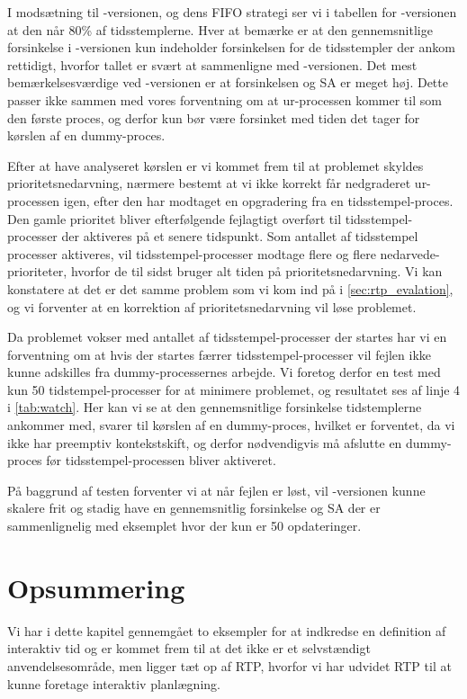 I modsætning til -versionen, og dens FIFO strategi ser vi i tabellen for -versionen at den  når 80\% af tidsstemplerne. Hver at bemærke er at den gennemsnitlige forsinkelse i -versionen kun indeholder forsinkelsen for de tidsstempler der ankom rettidigt, hvorfor tallet er svært at sammenligne med -versionen. Det mest bemærkelsesværdige ved -versionen er at forsinkelsen og SA  er meget høj. Dette passer ikke sammen med vores forventning om at ur-processen kommer til som den første proces, og derfor kun bør være forsinket med tiden det tager for kørslen af en  dummy-proces.

Efter at have analyseret kørslen er vi kommet frem til at problemet skyldes prioritetsnedarvning, nærmere bestemt at vi ikke korrekt får nedgraderet ur-processen igen, efter den har modtaget en opgradering fra en tidsstempel-proces. Den gamle prioritet bliver efterfølgende fejlagtigt overført til tidsstempel-processer der aktiveres på et senere tidspunkt. Som antallet af tidsstempel processer aktiveres, vil tidsstempel-processer modtage flere og flere nedarvede-prioriteter, hvorfor de til sidst bruger alt tiden på prioritetsnedarvning.  Vi kan konstatere at det er det samme problem som vi kom ind på i \cref{sec:rtp_evalation}, og vi forventer at en korrektion af prioritetsnedarvning vil løse problemet. 

Da problemet vokser med antallet af tidsstempel-processer der startes har vi en forventning om at hvis der startes færrer tidsstempel-processer vil fejlen ikke kunne adskilles fra dummy-processernes arbejde. Vi foretog derfor en test med kun 50 tidstempel-processer for at minimere problemet, og resultatet ses af linje 4 i \cref{tab:watch}. Her kan vi se at  den gennemsnitlige forsinkelse tidstemplerne ankommer med, svarer til kørslen af en dummy-proces, hvilket er forventet, da vi ikke har preemptiv kontekstskift, og derfor nødvendigvis må afslutte en dummy-proces før tidsstempel-processen bliver aktiveret. 

På baggrund af testen forventer vi at når fejlen er løst, vil -versionen kunne skalere frit og stadig have en gennemsnitlig forsinkelse og SA der er sammenlignelig med eksemplet hvor der kun er 50 opdateringer.

\section{Opsummering}

Vi har i dette kapitel gennemgået to eksempler for at indkredse en definition af interaktiv tid og er kommet frem til at det ikke er et selvstændigt anvendelsesområde, men ligger tæt op af RTP, hvorfor vi har udvidet RTP til at kunne foretage interaktiv planlægning.


